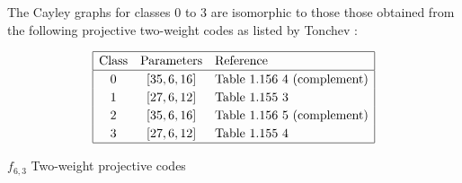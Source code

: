 \documentclass[12pt,a4paper]{article}
\begin{document}
The Cayley graphs for classes 0 to 3 are isomorphic to those those obtained from the following
projective two-weight
codes as listed by Tonchev \cite{Ton07codes}:

\begin{table}[!bhpt] %
\begin{align*}
\def\arraystretch{1.2}
\begin{array}{|ccl|}
\hline
\text{Class} &
\text{Parameters} & \text{Reference}
\\
\hline
0 & [35,6,16] & \text{Table 1.156 4 (complement)}
\\
1 & [27,6,12] & \text{Table 1.155 3 }
\\
2 & [35,6,16] & \text{Table 1.156 5 (complement)}
\\
3 & [27,6,12] & \text{Table 1.155 4 }
\\
\hline
\end{array}
\end{align*}
\caption{$f_{6,3}$ Two-weight projective codes}
\label{tab-c6_3_codes}
\end{table}
\end{document}
